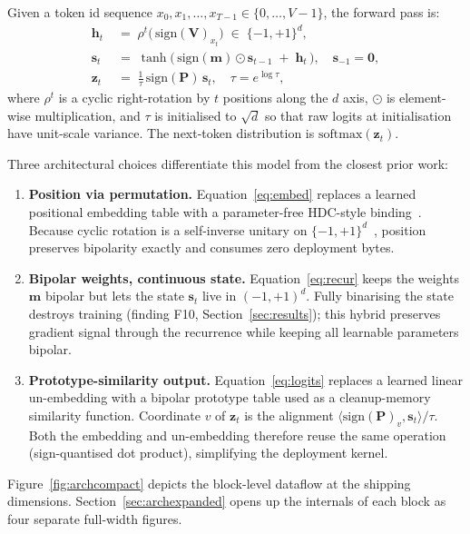 \documentclass[runningheads]{llncs}
\newcommand{\bipset}{\{-1,+1\}}
\newcommand{\bV}{\mathbf{V}}
\newcommand{\bP}{\mathbf{P}}
\newcommand{\bm}{\mathbf{m}}
\newcommand{\bh}{\mathbf{h}}
\newcommand{\bs}{\mathbf{s}}
\newcommand{\bz}{\mathbf{z}}
\begin{document}
Given a token id sequence
$x_0, x_1, \dots, x_{T-1} \in \{0, \dots, V{-}1\}$, the forward pass is:
\begin{align}
\bh_t \;&=\; \rho^{t}\!\bigl(\,\mathrm{sign}(\bV)_{x_t}\bigr) \;\in\; \bipset^{d},
\label{eq:embed}\\[2pt]
\bs_t \;&=\; \tanh\!\bigl(\,\mathrm{sign}(\bm)\odot\bs_{t-1} \;+\; \bh_t\,\bigr),
\quad \bs_{-1}=\mathbf{0},
\label{eq:recur}\\[2pt]
\bz_t \;&=\; \frac{1}{\tau}\,\mathrm{sign}(\bP)\,\bs_t,\quad \tau = e^{\log\tau},
\label{eq:logits}
\end{align}
where $\rho^{t}$ is a cyclic right-rotation by $t$ positions along the
$d$ axis, $\odot$ is element-wise multiplication, and $\tau$ is
initialised to $\sqrt{d}$ so that raw logits at initialisation have
unit-scale variance. The next-token distribution is
$\mathrm{softmax}(\bz_t)$.

Three architectural choices differentiate this model from the closest
prior work:

\begin{enumerate}
\item \textbf{Position via permutation.}
      Equation~\ref{eq:embed} replaces a learned positional embedding
      table with a parameter-free HDC-style
      binding~\cite{kanerva2009hyperdimensional}. Because cyclic
      rotation is a self-inverse unitary on
      $\bipset^{d}$~\cite{plate1995holographic}, position preserves
      bipolarity exactly and consumes zero deployment bytes.
\item \textbf{Bipolar weights, continuous state.}
      Equation~\ref{eq:recur} keeps the weights $\bm$ bipolar but
      lets the state $\bs_t$ live in $(-1,+1)^d$. Fully binarising
      the state destroys training (finding F10, Section~\ref{sec:results});
      this hybrid preserves gradient signal through the recurrence
      while keeping all learnable parameters bipolar.
\item \textbf{Prototype-similarity output.}
      Equation~\ref{eq:logits} replaces a learned linear un-embedding
      with a bipolar prototype table used as a cleanup-memory
      similarity function.
      Coordinate $v$ of $\bz_t$ is the alignment
      $\langle \mathrm{sign}(\bP)_v, \bs_t\rangle / \tau$.
      Both the embedding and un-embedding therefore reuse the same
      operation (sign-quantised dot product), simplifying the
      deployment kernel.
\end{enumerate}

Figure~\ref{fig:archcompact} depicts the block-level dataflow at the
shipping dimensions. Section~\ref{sec:archexpanded} opens up the
internals of each block as four separate full-width figures.
\end{document}

